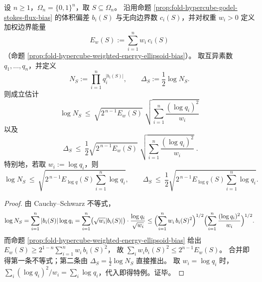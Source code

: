 
\begin{theorem}\label{thm:fold-hypercube-godel-length-energy-upperbound}
设 \(n\ge 1\)，\(\Omega_n=\{0,1\}^n\)，取 \(S\subseteq\Omega_n\)。
沿用命题 \ref{prop:fold-hypercube-godel-stokes-flux-bias} 的体积偏差 \(b_i(S)\) 与无向边界数 \(c_i(S)\)，并对权重 \(w_i>0\) 定义加权边界能量
\[
E_w(S):=\sum_{i=1}^n w_i\,c_i(S)
\]
（命题 \ref{prop:fold-hypercube-weighted-energy-ellipsoid-bias}）。
取互异素数 \(q_1,\dots,q_n\)，并定义
\[
N_S:=\prod_{i=1}^n q_i^{|b_i(S)|},\qquad
\Delta_S:=\frac12\log N_S.
\]
则成立估计
\[
\boxed{\;
\log N_S\ \le\ \sqrt{2^{\,n-1}E_w(S)}\;\sqrt{\sum_{i=1}^n \frac{(\log q_i)^2}{w_i}}\;}
\]
以及
\[
\boxed{\;
\Delta_S\ \le\ \frac12\sqrt{2^{\,n-1}E_w(S)}\;\sqrt{\sum_{i=1}^n \frac{(\log q_i)^2}{w_i}}\; }.
\]
特别地，若取 \(w_i:=\log q_i\)，则
\[
\log N_S\ \le\ \sqrt{2^{\,n-1}E_{\log q}(S)\sum_{i=1}^n \log q_i},
\qquad
\Delta_S\ \le\ \frac12\sqrt{2^{\,n-1}E_{\log q}(S)\sum_{i=1}^n \log q_i}.
\]
\end{theorem}

\begin{proof}
由 Cauchy--Schwarz 不等式，
\[
\log N_S=\sum_{i=1}^n |b_i(S)|\log q_i
=\sum_{i=1}^n \bigl(\sqrt{w_i}|b_i(S)|\bigr)\cdot\frac{\log q_i}{\sqrt{w_i}}
\le
\Bigl(\sum_{i=1}^n w_i\,b_i(S)^2\Bigr)^{1/2}
\Bigl(\sum_{i=1}^n \frac{(\log q_i)^2}{w_i}\Bigr)^{1/2}.
\]
而命题 \ref{prop:fold-hypercube-weighted-energy-ellipsoid-bias} 给出
\(
E_w(S)\ge 2^{1-n}\sum_{i=1}^n w_i\,b_i(S)^2
\)，
故 \(\sum_i w_i b_i(S)^2\le 2^{n-1}E_w(S)\)。
合并即得第一条不等式；第二条由 \(\Delta_S=\tfrac12\log N_S\) 直接推出。
取 \(w_i=\log q_i\) 时，\(\sum_i (\log q_i)^2/w_i=\sum_i\log q_i\)，代入即得特例。证毕。
\end{proof}

\endinput

